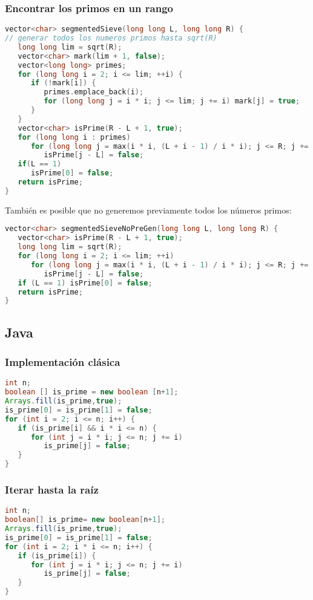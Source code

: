 \subsubsection{Encontrar los primos en un rango}
\begin{lstlisting}[language=C++]
vector<char> segmentedSieve(long long L, long long R) {
// generar todos los numeros primos hasta sqrt(R)
   long long lim = sqrt(R);
   vector<char> mark(lim + 1, false);
   vector<long long> primes;
   for (long long i = 2; i <= lim; ++i) {
      if (!mark[i]) {
         primes.emplace_back(i);
         for (long long j = i * i; j <= lim; j += i) mark[j] = true;
      }
   }
   vector<char> isPrime(R - L + 1, true);
   for (long long i : primes)
      for (long long j = max(i * i, (L + i - 1) / i * i); j <= R; j += i)
         isPrime[j - L] = false;
   if(L == 1)
      isPrime[0] = false;
   return isPrime;
}
\end{lstlisting}

También es posible que no generemos previamente todos los números primos:

\begin{lstlisting}[language=C++]
vector<char> segmentedSieveNoPreGen(long long L, long long R) {
   vector<char> isPrime(R - L + 1, true);
   long long lim = sqrt(R);
   for (long long i = 2; i <= lim; ++i)
      for (long long j = max(i * i, (L + i - 1) / i * i); j <= R; j += i)
	     isPrime[j - L] = false;
   if (L == 1) isPrime[0] = false;
   return isPrime;
}	
\end{lstlisting}

\subsection{Java}


\subsubsection{Implementación clásica}
\begin{lstlisting}[language=Java]
int n;
boolean [] is_prime = new boolean [n+1];
Arrays.fill(is_prime,true);
is_prime[0] = is_prime[1] = false;
for (int i = 2; i <= n; i++) {
   if (is_prime[i] && i * i <= n) {
      for (int j = i * i; j <= n; j += i)
         is_prime[j] = false;
   }
}
\end{lstlisting}

\subsubsection{Iterar hasta la raíz}
\begin{lstlisting}[language=Java]
int n;
boolean[] is_prime= new boolean[n+1];
Arrays.fill(is_prime,true);
is_prime[0] = is_prime[1] = false;
for (int i = 2; i * i <= n; i++) {
   if (is_prime[i]) {
      for (int j = i * i; j <= n; j += i)
         is_prime[j] = false;
   }
}	
\end{lstlisting}


